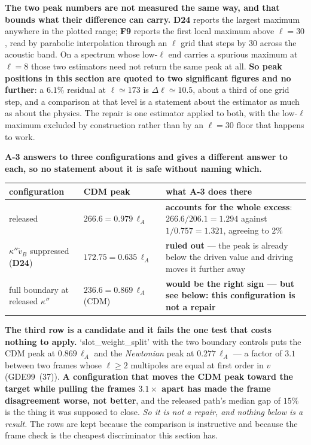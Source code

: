\textbf{The two peak numbers are not measured the same way, and that bounds
what their difference can carry.} \textbf{D24} reports the largest maximum
anywhere in the plotted range; \textbf{F9} reports the first local maximum
above $\ell=30$, read by parabolic interpolation through an $\ell$ grid that
steps by $30$ across the acoustic band. On a spectrum whose low-$\ell$ end
carries a spurious maximum at $\ell=8$ those two estimators need not return the
same peak at all. \textbf{So peak positions in this section are quoted to two
significant figures and no further}: a $6.1\%$ residual at $\ell\simeq173$ is
$\Delta\ell\simeq10.5$, about a third of one grid step, and a comparison at
that level is a statement about the estimator as much as about the physics.
The repair is one estimator applied to both, with the low-$\ell$ maximum
excluded by construction rather than by an $\ell=30$ floor that happens to
work.

\textbf{A-3 answers to three configurations and gives a different answer to
each, so no statement about it is safe without naming which.}

\begin{center}\small
\begin{tabularx}{\textwidth}{@{}l l >{\raggedright\arraybackslash}X@{}}
\toprule
\textbf{configuration} & \textbf{CDM peak} & \textbf{what A-3 does there} \\
\midrule
released & $266.6=0.979\,\ell_A$ & \textbf{accounts for the whole excess}:
  $266.6/206.1=1.294$ against $1/0.757=1.321$, agreeing to $2\%$ \\
$\kappa''\tilde v_B$ suppressed (\textbf{D24}) & $172.75=0.635\,\ell_A$ &
  \textbf{ruled out} --- the peak is already below the driven value and
  driving moves it further away \\
full boundary at released $\kappa''$ & $236.6=0.869\,\ell_A$ (CDM) &
  \textbf{would be the right sign --- but see below: this configuration is not
  a repair} \\
\bottomrule
\end{tabularx}
\end{center}

\textbf{The third row is a candidate and it fails the one test that costs
nothing to apply.} `slot\_weight\_split' with the two boundary controls puts
the CDM peak at $0.869\,\ell_A$ and the \emph{Newtonian} peak at
$0.277\,\ell_A$ --- a factor of $3.1$ between two frames whose $\ell\ge2$
multipoles are equal at first order in $v$ (GDE99~(37)). \textbf{A
configuration that moves the CDM peak toward the target while pulling the
frames $3.1\times$ apart has made the frame disagreement worse, not better},
and the released path's median gap of $15\%$ is the thing it was supposed to
close. \emph{So it is not a repair, and nothing below is a result.} The rows
are kept because the comparison is instructive and because the frame check is
the cheapest discriminator this section has.

